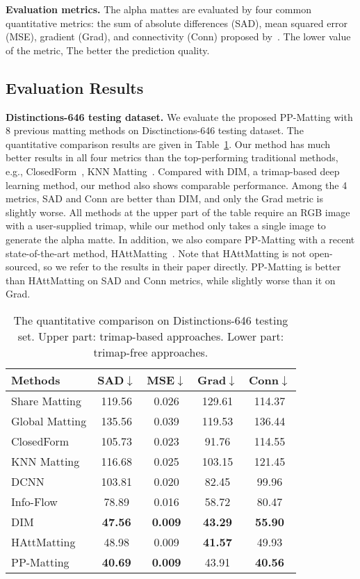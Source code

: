 \documentclass[10pt,twocolumn,letterpaper]{article}
\begin{document}
\textbf{Evaluation metrics.} The alpha mattes are evaluated by four common quantitative metrics: the sum of absolute differences (SAD), mean squared error (MSE), gradient (Grad), and connectivity (Conn) proposed by~\cite{rhemann2009perceptually}. The lower value of the metric, The better the prediction quality.


\subsection{Evaluation Results}

\textbf{Distinctions-646 testing dataset.} We evaluate the proposed PP-Matting with 8 previous matting methods on Disctinctions-646 testing dataset. The quantitative comparison results are given in Table~\ref{tab:distinctions}. Our method has much better results in all four metrics than the top-performing traditional methods, e.g., ClosedForm~\cite{levin2007closed}, KNN Matting~\cite{chen2013knn}. Compared with DIM, a trimap-based deep learning method, our method also shows comparable performance. Among the 4 metrics, SAD and Conn are better than DIM, and only the Grad metric is slightly worse. All methods at the upper part of the table require an RGB image with a user-supplied trimap, while our method only takes a single image to generate the alpha matte. In addition, we also compare PP-Matting with a recent state-of-the-art method, HAttMatting~\cite{qiao2020attention}. Note that HAttMatting is not open-sourced, so we refer to the results in their paper directly. PP-Matting is better than HAttMatting on SAD and Conn metrics, while slightly worse than it on Grad.

\begin{table}
  \centering
  \begin{tabular}{@{}lcccc@{}}
    \toprule
    Methods & SAD$\downarrow$ & MSE$\downarrow$ & Grad$\downarrow$ & Conn$\downarrow$ \\
    \midrule
    Share Matting \cite{gastal2010shared} & 119.56 & 0.026 & 129.61 & 114.37 \\
    Global Matting\cite{he2011global} & 135.56 & 0.039 & 119.53 & 136.44 \\
    ClosedForm \cite{levin2007closed} & 105.73 & 0.023 & 91.76 & 114.55 \\
    KNN Matting \cite{chen2013knn} & 116.68 & 0.025 & 103.15 & 121.45 \\
    DCNN \cite{shen2016deep} & 103.81 & 0.020 & 82.45 & 99.96 \\
    Info-Flow \cite{aksoy2017designing} & 78.89 & 0.016 & 58.72 & 80.47 \\
    DIM \cite{xu2017deep} & \bf{47.56} & \bf{0.009} & \bf{43.29} & \bf{55.90} \\
    \midrule
    HAttMatting \cite{qiao2020attention} & 48.98 & 0.009 & \bf{41.57} & 49.93 \\
PP-Matting & \bf{40.69} & \bf{0.009} & 43.91 & \bf{40.56} \\
    \bottomrule
  \end{tabular}
  \caption{The quantitative comparison on Distinctions-646 testing set. Upper part: trimap-based approaches. Lower part: trimap-free approaches.}
  \label{tab:distinctions}
\end{table}
\end{document}
